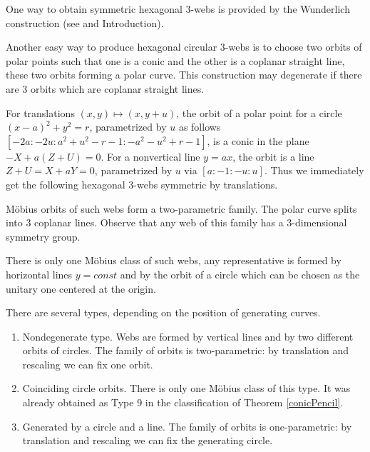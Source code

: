 \documentclass[11pt,a4paper]{article}
\begin{document}
One way to obtain symmetric hexagonal 3-webs is provided by the Wunderlich  construction (see  \cite{W-38} and  Introduction). 


Another easy way to produce hexagonal circular 3-webs is to choose two orbits of  polar points such that one is a conic and the other is a coplanar straight line, these two orbits forming a polar curve. This construction may degenerate if there are 3 orbits which are coplanar straight lines.  

For  translations $(x,y)\mapsto (x,y+u)$, the orbit of a polar point for  a circle $(x-a)^2+y^2=r$,  parametrized  by $u$ as follows $[-2a:-2u: a^2+u^2-r-1: -a^2-u^2+r-1]$, is a conic in the plane $-X+a(Z+U)=0$. For a nonvertical line $y=ax$, the orbit is a line $Z+U=X+aY=0$, parametrized by $u$ via $[a:-1:-u:u]$.
Thus we immediately get the following hexagonal 3-webs symmetric by translations.
 
 
\bigskip
{}

\noindent Möbius orbits of such webs form a two-parametric family. The polar curve splits into 3 coplanar lines. Observe that any web of this family has a 3-dimensional symmetry group.   

\bigskip
{}

\noindent There is only one Möbius class of such webs, any representative is formed by  horizontal lines $y=const$ and  by the orbit of  a circle which can be chosen as the unitary one centered at the origin.   
 
 \bigskip
{}

\noindent There are several types, depending on the position of generating curves. 
\begin{enumerate}
\item Nondegenerate type. Webs are formed by vertical lines and by two different orbits of circles.  The family of orbits is two-parametric: by translation and rescaling we can fix one orbit. 

\item Coinciding circle orbits. There is only one Möbius class of this type. It was already obtained as Type 9 in the classification of Theorem \ref{conicPencil}. 

\item Generated by a circle and a line. The family of orbits is one-parametric: by translation and rescaling we can fix the generating circle. 
\end{enumerate}
\end{document}
